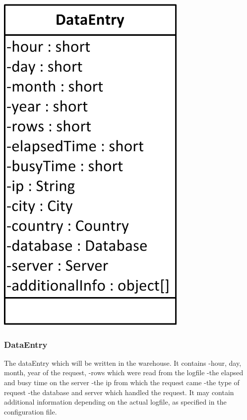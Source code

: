 \begin{center}
\includegraphics{Pictures/Parts/DataEntry.png}
\end{center}  

\subsubsection*{DataEntry}
The dataEntry which will be written in the warehouse.
It contains 
-hour, day, month, year of the request,
-rows which were read  from the logfile%
-the elapsed and busy time on the server
-the ip from which the request came
-the type of request
-the database and server which handled the request. %
It may contain additional information depending on the actual logfile, as specified in the configuration file. 



